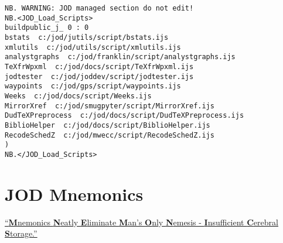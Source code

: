 \begin{lstlisting}[frame=single,framerule=0pt,basicstyle=\ttfamily\footnotesize]   
NB. WARNING: JOD managed section do not edit!
NB.<JOD_Load_Scripts>
buildpublic_j_ 0 : 0
bstats  c:/jod/jutils/script/bstats.ijs
xmlutils  c:/jod/utils/script/xmlutils.ijs
analystgraphs  c:/jod/franklin/script/analystgraphs.ijs
TeXfrWpxml  c:/jod/docs/script/TeXfrWpxml.ijs
jodtester  c:/jod/joddev/script/jodtester.ijs
waypoints  c:/jod/gps/script/waypoints.ijs
Weeks  c:/jod/docs/script/Weeks.ijs
MirrorXref  c:/jod/smugpyter/script/MirrorXref.ijs
DudTeXPreprocess  c:/jod/docs/script/DudTeXPreprocess.ijs
BiblioHelper  c:/jod/docs/script/BiblioHelper.ijs
RecodeSchedZ  c:/jod/mwecc/script/RecodeSchedZ.ijs
)
NB.</JOD_Load_Scripts>
\end{lstlisting}

\newpage


\newpage


\newpage

  
\newpage


\newpage
\section{JOD Mnemonics}

\large
\itshape
  
\href{https://www.acronymfinder.com/Mnemonics-Neatly-Eliminate-Man's-Only-Nemesis-_-Insufficient-Cerebral-Storage-(MNEMONICS).html}{``\textbf{M}nemonics \textbf{N}eatly \textbf{E}liminate \textbf{M}an's \textbf{O}nly \textbf{N}emesis - \textbf{I}nsufficient \textbf{C}erebral \textbf{S}torage.''}

\Large

